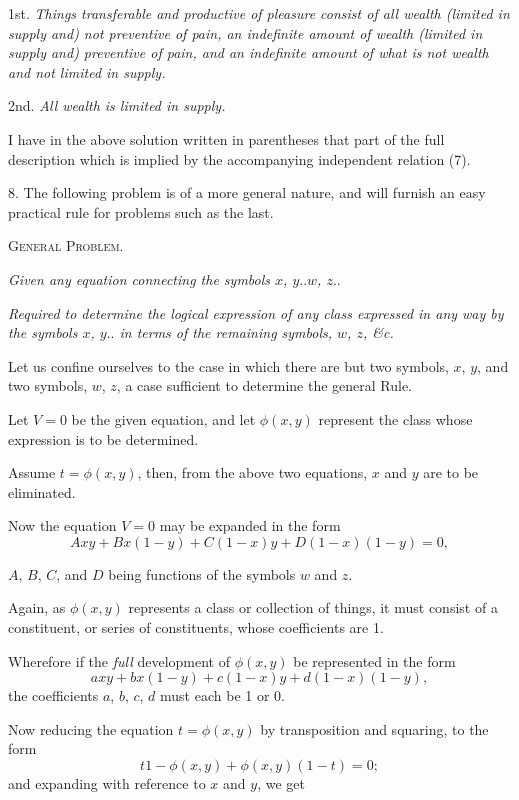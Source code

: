 \documentclass[oneside]{book}
\begin{document}
1st. \textit{Things transferable and productive of pleasure consist of
all wealth (limited in supply and) not preventive of pain, an
indefinite amount of wealth (limited in supply and) preventive of pain,
and an indefinite amount of what is not wealth and not limited in
supply.}

2nd. \textit{All wealth is limited in supply.}

I have in the above solution written in parentheses that part
of the full description which is implied by the accompanying
independent relation (7).

8. The following problem is of a more general nature, and
will furnish an easy practical rule for problems such as the last.

\begin{center}
\textsc{General Problem}.
\end{center}

\textit{Given any equation connecting the symbols $x$, $y..w$, $z..$}

\textit{Required to determine the logical expression of any class
expressed in any way by the symbols $x$, $y..$ in terms of the remaining
symbols, $w$, $z$, \&c.}

Let us confine ourselves to the case in which there are but
two symbols, $x$, $y$, and two symbols, $w$, $z$, a case sufficient to
determine the general Rule.

Let $V=0$ be the given equation, and let $\phi (x,y)$ represent
the class whose expression is to be determined.

Assume $t = \phi (x,y)$, then, from the above two equations, $x$
and $y$ are to be eliminated.

Now the equation $V=0$ may be expanded in the form
\setcounter{equation}{0}
\begin{equation}
Axy + Bx(1-y) + C(1-x)y + D(1-x) (1-y) = 0,
\end{equation}

$A$, $B$, $C$, and $D$ being functions of the symbols $w$ and $z$.

Again, as $\phi (x,y)$ represents a class or collection of things, it
must consist of a constituent, or series of constituents, whose
coefficients are 1.

Wherefore if the \textit{full} development of $\phi (x, y)$ be represented in the form
\[
axy+ bx(1 - y) + c(1 - x)y + d(1 - x) (1 - y),
\]
the coefficients $a$, $b$, $c$, $d$ must each be 1 or 0.

Now reducing the equation $t = \phi (x, y)$ by transposition and
squaring, to the form
\[
t{1-\phi(x,y)} + \phi(x,y)(1-t) = 0;
\]
and expanding with reference to $x$ and $y$, we get
\end{document}
